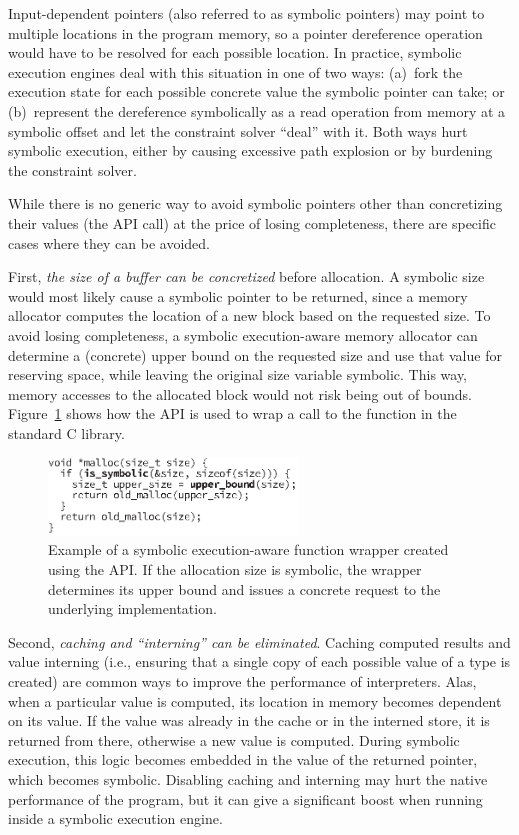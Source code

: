 Input-dependent pointers (also referred to as symbolic pointers) may point to multiple locations in the program memory, so a pointer dereference operation would have to be resolved for each possible location.  In practice, symbolic execution engines deal with this situation in one of two ways:
%
(a)~fork the execution state for each possible concrete value the symbolic pointer can take; or
%
(b)~represent the dereference symbolically as a read operation from memory at a symbolic offset and let the constraint solver ``deal'' with it.
%
Both ways hurt symbolic execution, either by causing excessive path explosion or by burdening the constraint solver.

While there is no generic way to avoid symbolic pointers other than concretizing their values (the  API call) at the price of losing completeness, there are specific cases where they can be avoided.

First, \emph{the size of a buffer can be concretized} before allocation.  A symbolic size would most likely cause a symbolic pointer to be returned, since a memory allocator computes the location of a new block based on the requested size.  To avoid losing completeness, a symbolic execution-aware memory allocator can determine a (concrete) upper bound on the requested size and use that value for reserving space, while leaving the original size variable symbolic.  This way, memory accesses to the allocated block would not risk being out of bounds.  Figure~\ref{fig:sym-malloc} shows how the \chef API is used to wrap a call to the  function in the standard C library.

\begin{figure}
  \centering
  \includegraphics[width=2.6in]{figures/chef/mallocopt}
  \caption{Example of a symbolic execution-aware  function wrapper created using the \chef API.  If the allocation size is symbolic, the wrapper determines its upper bound and issues a concrete request to the underlying implementation.}
  \label{fig:sym-malloc}
\end{figure}

Second, \emph{caching and ``interning'' can be eliminated}.  Caching computed results and value interning (i.e., ensuring that a single copy of each possible value of a type is created) are common ways to improve the performance of interpreters.  Alas, when a particular value is computed, its location in memory becomes dependent on its value. If the value was already in the cache or in the interned store, it is returned from there, otherwise a new value is computed.  During symbolic execution, this logic becomes embedded in the value of the returned pointer, which becomes symbolic.  Disabling caching and interning may hurt the native performance of the program, but it can give a significant boost when running inside a symbolic execution engine.

